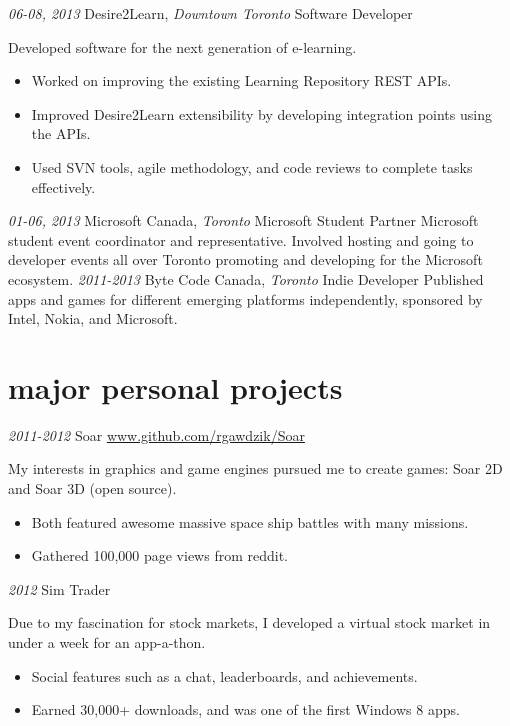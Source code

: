 \documentclass[]{friggeri-cv}
\begin{document}
\begin{entrylist}
  \entry
    {\emph{06-08, 2013}}
    {Desire2Learn, {\normalfont \emph{Downtown Toronto}}}
    {Software Developer}
    {Developed software for the next generation of e-learning.
         \begin{itemize}
	\item Worked on improving the existing Learning Repository REST APIs.
	\item Improved Desire2Learn extensibility by developing integration points using the APIs.
	\item Used SVN tools, agile methodology, and code reviews to complete tasks effectively.
	\end{itemize}}
  \entry
    {\emph{01-06, 2013}}
    {Microsoft Canada, {\normalfont \emph{Toronto}}}
    {Microsoft Student Partner}
    {Microsoft student event coordinator and representative. Involved hosting and going to developer events all over Toronto promoting and developing for the Microsoft ecosystem.}
  \entry
    {\emph{2011-2013}}
    {Byte Code Canada, {\normalfont \emph{Toronto}}}
    {Indie Developer}
    {Published apps and games for different emerging platforms independently, sponsored by Intel, Nokia, and Microsoft.}
\end{entrylist}

\section{major personal projects}

\begin{entrylist}
\entry
    {\emph{2011-2012}}
    {Soar}
    {\href{https://github.com/rgawdzik/Soar}{www.github.com/rgawdzik/Soar}}
    {My interests in graphics and game engines pursued me to create games: Soar 2D and Soar 3D (open source).
    \begin{itemize}
      \item Both featured awesome massive space ship battles with many missions.
      \item Gathered 100,000 page views from reddit.
      \end{itemize}}
  \entry
    {\emph{2012}}
    {Sim Trader}
    {}
    {Due to my fascination for stock markets, I developed a virtual stock market in under a week for an app-a-thon.
    \begin{itemize}
    \item Social features such as a chat, leaderboards, and achievements. 
    \item Earned 30,000+ downloads, and was one of the first Windows 8 apps.
    \end{itemize}}
\end{entrylist}
\end{document}
